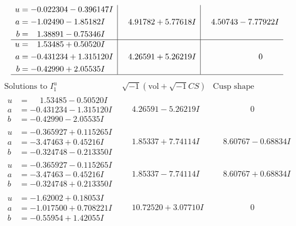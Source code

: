 \documentclass[1p]{elsarticle_modified}
\theoremstyle{definition}
\newcommand{\I}{\sqrt{-1}}
\begin{document}
$$\begin{array}{c|c|c}
\begin{aligned}
u &= -0.022304 - 0.396147 I \\
a &= -1.02490 - 1.85182 I \\
b &= \phantom{-}1.38891 - 0.75346 I\end{aligned}
 & \phantom{-}4.91782 + 5.77618 I & \phantom{-}4.50743 - 7.77922 I \\ \hline\begin{aligned}
u &= \phantom{-}1.53485 + 0.50520 I \\
a &= -0.431234 + 1.315120 I \\
b &= -0.42990 + 2.05535 I\end{aligned}
 & \phantom{-}4.26591 + 5.26219 I & \phantom{-0.000000 } 0\\
 \hline 
 \end{array}$$\newpage$$\begin{array}{c|c|c}  
\text{Solutions to }I^u_{1}& \I (\text{vol} + \sqrt{-1}CS) & \text{Cusp shape}\\
 \hline 
\begin{aligned}
u &= \phantom{-}1.53485 - 0.50520 I \\
a &= -0.431234 - 1.315120 I \\
b &= -0.42990 - 2.05535 I\end{aligned}
 & \phantom{-}4.26591 - 5.26219 I & \phantom{-0.000000 } 0 \\ \hline\begin{aligned}
u &= -0.365927 + 0.115265 I \\
a &= -3.47463 + 0.45216 I \\
b &= -0.324748 - 0.213350 I\end{aligned}
 & \phantom{-}1.85337 + 7.74114 I & \phantom{-}8.60767 - 0.68834 I \\ \hline\begin{aligned}
u &= -0.365927 - 0.115265 I \\
a &= -3.47463 - 0.45216 I \\
b &= -0.324748 + 0.213350 I\end{aligned}
 & \phantom{-}1.85337 - 7.74114 I & \phantom{-}8.60767 + 0.68834 I \\ \hline\begin{aligned}
u &= -1.62002 + 0.18053 I \\
a &= -1.017500 + 0.708221 I \\
b &= -0.55954 + 1.42055 I\end{aligned}
 & \phantom{-}10.72520 + 3.07710 I & \phantom{-0.000000 } 0 \\ \hline\begin{aligned}

\end{aligned}
\end{array}$$
\end{document}
